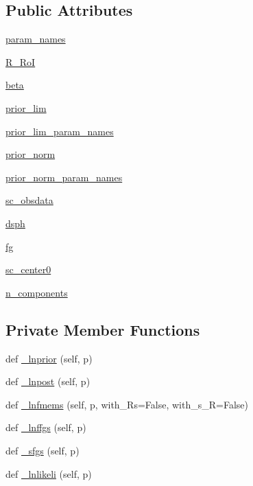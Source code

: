\subsection*{Public Attributes}
\begin{DoxyCompactItemize}
\item 
\hyperlink{classmodki17_1_1modKI17_a5e048c622e6d8ffe204c4d858ffb157e}{param\+\_\+names}
\item 
\hyperlink{classmodki17_1_1modKI17_a96feddcfb195555d34758835b7f00e1a}{R\+\_\+\+RoI}
\item 
\hyperlink{classmodki17_1_1modKI17_add6ca2ccf70e3fbc0d517efec833e797}{beta}
\item 
\hyperlink{classmodki17_1_1modKI17_af802630a5e3c7396fb0cb141a8452b1e}{prior\+\_\+lim}
\item 
\hyperlink{classmodki17_1_1modKI17_ae8face44a728aa6893b44c435aee74e4}{prior\+\_\+lim\+\_\+param\+\_\+names}
\item 
\hyperlink{classmodki17_1_1modKI17_a528d1853936dce9f7b708e49ee96f0eb}{prior\+\_\+norm}
\item 
\hyperlink{classmodki17_1_1modKI17_aff2678a6fb3202ffc2c1cd9d0efbbaef}{prior\+\_\+norm\+\_\+param\+\_\+names}
\item 
\hyperlink{classmodki17_1_1modKI17_aa08fa3ee418f2bd940af163631572e8b}{sc\+\_\+obsdata}
\item 
\hyperlink{classmodki17_1_1modKI17_a72b197ab9f29a3a2768f9becda673413}{dsph}
\item 
\hyperlink{classmodki17_1_1modKI17_ab1da6423024d2343a70508572859af80}{fg}
\item 
\hyperlink{classmodki17_1_1modKI17_a6324ea4fafc077df02e9f29448b4510d}{sc\+\_\+center0}
\item 
\hyperlink{classmodki17_1_1modKI17_addbac712b42432f42456a732e65fa472}{n\+\_\+components}
\end{DoxyCompactItemize}
\subsection*{Private Member Functions}
\begin{DoxyCompactItemize}
\item 
def \hyperlink{classmodki17_1_1modKI17_afbd9170967100bb7fefe8cef8cfcd520}{\+\_\+lnprior} (self, p)
\item 
def \hyperlink{classmodki17_1_1modKI17_a13262c1d5c53fa14ca3e74df3bcfd7bf}{\+\_\+lnpost} (self, p)
\item 
def \hyperlink{classmodki17_1_1modKI17_af86144a3ec43facf835be07b718d9560}{\+\_\+lnfmems} (self, p, with\+\_\+\+Rs=False, with\+\_\+s\+\_\+R=False)
\item 
def \hyperlink{classmodki17_1_1modKI17_ac4f7ff6b06910b39762b7e4cdddd9063}{\+\_\+lnffgs} (self, p)
\item 
def \hyperlink{classmodki17_1_1modKI17_a23a8694e674a462a35cebe0d7ddc00fb}{\+\_\+sfgs} (self, p)
\item 
def \hyperlink{classmodki17_1_1modKI17_a54b0d8abd39c0ab4c04cb1e52eafe9c5}{\+\_\+lnlikeli} (self, p)
\end{DoxyCompactItemize}
